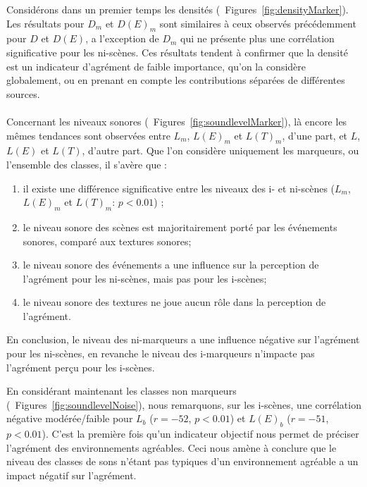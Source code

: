 Considérons dans un premier temps les densités (\cf~Figures~\ref{fig:densityMarker}). Les résultats pour $D_m$ et $D(E)_m$ sont similaires à ceux observés précédemment pour $D$ et $D(E)$, a l'exception de $D_m$  qui ne présente plus une corrélation significative pour les ni-scènes. Ces résultats tendent à confirmer que la densité est un indicateur d'agrément de faible importance, qu'on la considère globalement, ou en prenant en compte les contributions séparées de différentes sources. \\

 \\

Concernant les niveaux sonores (\cf~Figures~\ref{fig:soundlevelMarker}), là encore les mêmes tendances sont observées entre $L_m$, $L(E)_m$ et $L(T)_m$, d'une part, et $L$, $L(E)$ et $L(T)$, d'autre part. Que l'on considère uniquement les marqueurs, ou l'ensemble des classes, il s'avère que :

\begin{enumerate}
\item il existe une différence significative entre les niveaux des i- et ni-scènes ($L_m$, $L(E)_m$ et $L(T)_m$: $p<0.01$) ;
\item le niveau sonore des scènes est majoritairement porté par les événements sonores, comparé aux textures sonores;
\item le niveau sonore des événements a une influence sur la perception de l'agrément pour les ni-scènes, mais pas pour les i-scènes;
\item le niveau sonore des textures ne joue aucun rôle dans la perception de l'agrément.
\end{enumerate}

En conclusion, le niveau des ni-marqueurs a une influence négative sur l'agrément pour les ni-scènes, en revanche le niveau des i-marqueurs n’impacte pas l'agrément perçu pour les i-scènes.

En considérant maintenant les classes non marqueurs  (\cf~Figures~\ref{fig:soundlevelNoise}), nous remarquons, sur les i-scènes, une corrélation négative modérée/faible pour $L_b$  ($r=-52$, $p<0.01$) et $L(E)_b$ ($r=-51$, $p<0.01$). C'est la première fois qu'un indicateur objectif nous permet de préciser l'agrément des environnements agréables. Ceci nous amène à conclure que le niveau des classes de sons n'étant pas typiques d'un environnement agréable a un impact négatif sur l'agrément. 

